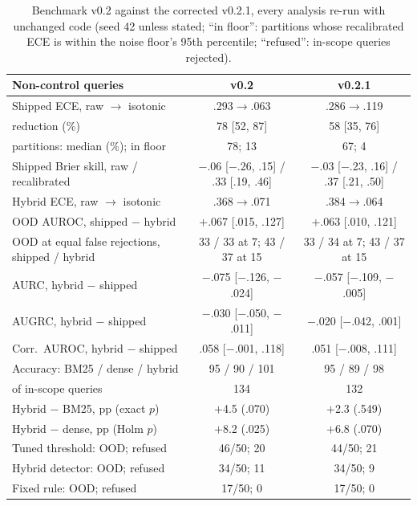 \begin{table}[t]
  \centering
  \small
  \setlength{\tabcolsep}{3pt}
  \begin{tabular}{@{}lcc@{}}
    \toprule
    \textbf{Non-control queries} & \textbf{v0.2} & \textbf{v0.2.1} \\
    \midrule
    Shipped ECE, raw $\to$ isotonic & .293$\to$.063 & .286$\to$.119 \\
    \quad reduction (\%) & 78 [52, 87] & 58 [35, 76] \\
    \quad 20 partitions: median (\%); in floor & 78; 13 & 67; 4 \\
    Shipped Brier skill, raw / recalibrated & $-$.06 [$-$.26, .15] / .33 [.19, .46] & $-$.03 [$-$.23, .16] / .37 [.21, .50] \\
    Hybrid ECE, raw $\to$ isotonic & .368$\to$.071 & .384$\to$.064 \\
    OOD AUROC, shipped $-$ hybrid & $+$.067 [.015, .127] & $+$.063 [.010, .121] \\
    OOD at equal false rejections, shipped / hybrid & 33 / 33 at 7; 43 / 37 at 15 & 33 / 34 at 7; 43 / 37 at 15 \\
    AURC, hybrid $-$ shipped & $-$.075 [$-$.126, $-$.024] & $-$.057 [$-$.109, $-$.005] \\
    AUGRC, hybrid $-$ shipped & $-$.030 [$-$.050, $-$.011] & $-$.020 [$-$.042, .001] \\
    Corr.\ AUROC, hybrid $-$ shipped & .058 [$-$.001, .118] & .051 [$-$.008, .111] \\
    Accuracy: BM25 / dense / hybrid & 95 / 90 / 101 & 95 / 89 / 98 \\
    \quad of in-scope queries & 134 & 132 \\
    Hybrid $-$ BM25, pp (exact $p$) & $+$4.5 (.070) & $+$2.3 (.549) \\
    Hybrid $-$ dense, pp (Holm $p$) & $+$8.2 (.025) & $+$6.8 (.070) \\
    Tuned threshold: OOD; refused & 46/50; 20 & 44/50; 21 \\
    Hybrid detector: OOD; refused & 34/50; 11 & 34/50; 9 \\
    Fixed rule: OOD; refused & 17/50; 0 & 17/50; 0 \\
    \bottomrule
  \end{tabular}
  \caption{Benchmark v0.2 against the corrected v0.2.1, every analysis re-run with unchanged code (seed 42
  unless stated; ``in floor'': partitions whose recalibrated ECE is within the noise floor's 95th percentile;
  ``refused'': in-scope queries rejected).}
  \label{tab:v021}
\end{table}
